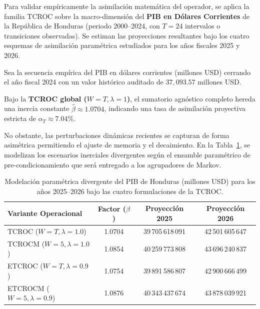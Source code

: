 Para validar empíricamente la asimilación matemática del operador, se aplica la familia TCROC sobre la macro-dimensión del \textbf{PIB en Dólares Corrientes} de la República de Honduras (periodo 2000--2024, con \(T = 24\) intervalos o transiciones observadas). Se estiman las proyecciones resultantes bajo los cuatro esquemas de asimilación paramétrica estudiados para los años fiscales 2025 y 2026.

\begin{examplex}
\label{ex:pib_dolares_2026}
Sea la secuencia empírica del PIB en dólares corrientes (millones USD) cerrando el año fiscal 2024 con un valor histórico auditado de \(37,093.57\) millones USD. 

Bajo la \textbf{TCROC global (\(W=T, \lambda=1\))}, el sumatorio agnóstico completo hereda una inercia constante \(\hat{\beta} \approx 1.0704\), indicando una tasa de asimilación proyectiva estricta de \(\alpha_T \approx 7.04\%\). 

No obstante, las perturbaciones dinámicas recientes se capturan de forma asimétrica permitiendo el ajuste de memoria y el decaimiento. En la Tabla~\ref{tab:proy_tcroc_pib}, se modelizan los escenarios inerciales divergentes según el ensamble paramétrico de pre-condicionamiento que será entregado a los agrupadores de Markov.

\begin{table}[H]
\centering
\begin{tabular}{@{}lccc@{}}
\toprule
\textbf{Variante Operacional} & \textbf{Factor ($\hat{\beta}$)} & \textbf{Proyección 2025} & \textbf{Proyección 2026} \\
\midrule
TCROC ($W=T, \lambda=1.0$)   & 1.0704 & 39\,705\,618\,091 & 42\,501\,605\,647 \\
TCROCM ($W=5, \lambda=1.0$)   & 1.0854 & 40\,259\,773\,808 & 43\,696\,240\,837 \\
ETCROC ($W=T, \lambda=0.9$)  & 1.0754 & 39\,891\,586\,807 & 42\,900\,666\,499 \\
ETCROCM ($W=5, \lambda=0.9$) & 1.0876 & 40\,343\,437\,674 & 43\,878\,039\,921 \\
\bottomrule
\end{tabular}
\caption{Modelación paramétrica divergente del PIB de Honduras (millones USD) para los años 2025--2026 bajo las cuatro formulaciones de la TCROC.}
\label{tab:proy_tcroc_pib}
\end{table}
\end{examplex}


